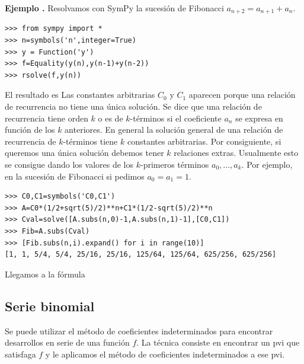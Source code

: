 \documentclass{article}
\newcounter{ejem_cont}
\newenvironment{ejemplo}[1]{\refstepcounter{ejem_cont}\vspace{1ex}\noindent\textbf{Ejemplo \arabic{ejem_cont}.} #1}{}
\begin{document}
\begin{ejemplo} Resolvamos con SymPy la sucesión de Fibonacci $a_{n+2}=a_{n+1}+a_n$.
\begin{lstlisting}
>>> from sympy import *
>>> n=symbols('n',integer=True)
>>> y = Function('y')
>>> f=Equality(y(n),y(n-1)+y(n-2))
>>> rsolve(f,y(n))
\end{lstlisting}

 El resultado es
Las constantes arbitrarias $C_0$ y $C_1$ aparecen porque una relación de recurrencia no tiene una única solución. Se dice que una relación de recurrencia tiene orden $k$ o es de $k$-términos si el coeficiente $a_n$ se expresa en función de los $k$  anteriores. En general la solución general de una relación de recurrencia de $k$-términos tiene $k$ constantes arbitrarias. Por consiguiente, si queremos una única solución debemos tener $k$ relaciones extras. Usualmente esto se consigue dando los valores de los $k$-primeros términos $a_0,\ldots,a_k$. Por ejemplo, en  la sucesión de Fibonacci si pedimos $a_0=a_1=1$.

\begin{lstlisting}
>>> C0,C1=symbols('C0,C1')
>>> A=C0*(1/2+sqrt(5)/2)**n+C1*(1/2-sqrt(5)/2)**n
>>> Cval=solve([A.subs(n,0)-1,A.subs(n,1)-1],[C0,C1])
>>> Fib=A.subs(Cval)
>>> [Fib.subs(n,i).expand() for i in range(10)]
[1, 1, 5/4, 5/4, 25/16, 25/16, 125/64, 125/64, 625/256, 625/256]
\end{lstlisting}
Llegamos a la fórmula

\end{ejemplo}

\subsection{Serie binomial}

 Se puede utilizar el método de coeficientes indeterminados para encontrar desarrollos en serie de una función  $f$. La técnica consiste en encontrar un pvi que satisfaga $f$ y le aplicamos el método de coeficientes indeterminados a ese pvi.
\end{document}
